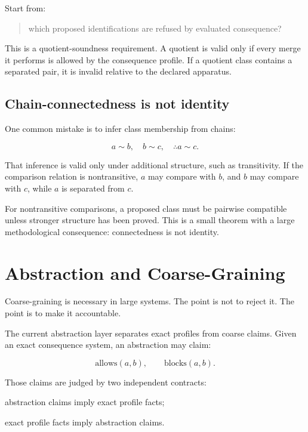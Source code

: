 \documentclass[11pt]{article}
\begin{document}
Start from:

\begin{quote}
which proposed identifications are refused by evaluated consequence?
\end{quote}

This is a quotient-soundness requirement. A quotient is valid only if every
merge it performs is allowed by the consequence profile. If a quotient class
contains a separated pair, it is invalid relative to the declared apparatus.

\subsection{Chain-connectedness is not identity}

One common mistake is to infer class membership from chains:

\[
a \sim b,\quad b \sim c,\quad \therefore a \sim c.
\]

That inference is valid only under additional structure, such as transitivity.
If the comparison relation is nontransitive, \(a\) may compare with \(b\), and
\(b\) may compare with \(c\), while \(a\) is separated from \(c\).

For nontransitive comparisons, a proposed class must be pairwise compatible
unless stronger structure has been proved. This is a small theorem with a large
methodological consequence: connectedness is not identity.

\section{Abstraction and Coarse-Graining}

Coarse-graining is necessary in large systems. The point is not to reject it.
The point is to make it accountable.

The current abstraction layer separates exact profiles from coarse claims.
Given an exact consequence system, an abstraction may claim:

\[
\mathrm{allows}(a,b), \qquad \mathrm{blocks}(a,b).
\]

Those claims are judged by two independent contracts:

\begin{description}[leftmargin=*]
  \item[soundness] abstraction claims imply exact profile facts;
  \item[completeness] exact profile facts imply abstraction claims.
\end{description}
\end{document}
